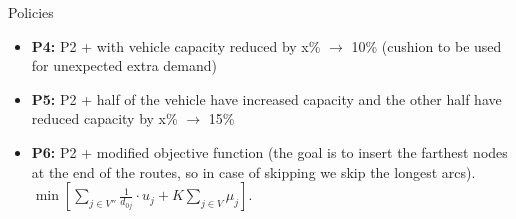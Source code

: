 \documentclass{beamer} %
\theoremstyle{definition} %
\begin{document}
\begin{frame}{Policies}
	\begin{itemize}
		
		\item \textbf{P4:} P2 + with vehicle capacity reduced by x\% $\rightarrow$ 10\% (cushion to be used for unexpected extra demand)
		
		\item \textbf{P5:} P2 + half of the vehicle have increased capacity and the other half have reduced capacity by x\% $\rightarrow$ 15\%
		
		\item \textbf{P6:} P2 + modified objective function  (the goal is to insert the farthest nodes at the end of the routes, so in case of skipping we skip the longest arcs). $\min \left[ \sum_{j \in V''} \frac{1}{d_{0j}} \cdot u_{j} + K\sum_{j \in V} \mu_j \right]$.
	\end{itemize}
\end{frame}
\end{document}
